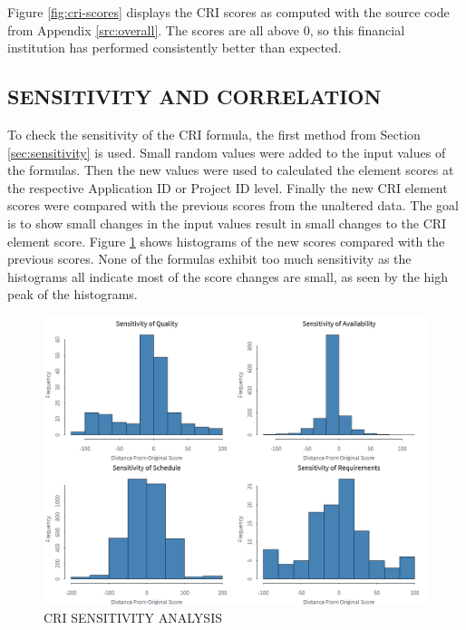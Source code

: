 \documentclass[SDSUThesis.tex]{subfiles}
\begin{document}
        Figure \ref{fig:cri-scores}
        displays the CRI scores as computed with the source code
        from Appendix \ref{src:overall}.  The scores are all above 0, so this
        financial institution has performed consistently better
        than expected.  
        
    \subsection{SENSITIVITY AND CORRELATION}
        
        To check the sensitivity of the CRI formula, the first method
        from Section \ref{sec:sensitivity} is used.  Small random
        values were added to the input values of the formulas. 
        Then the new values were used to calculated the element scores 
        at the respective Application ID or Project ID level.  Finally
        the new CRI element scores were compared with the previous
        scores from the unaltered data.  The goal is to show small
        changes in the input values result in small changes to the 
        CRI element score.  Figure \ref{fig:sensitivity} shows
        histograms of the new scores compared with the previous scores.
        None of the formulas exhibit too much sensitivity as the 
        histograms all indicate most of the score changes are small,
        as seen by the high peak of the histograms.  
        
        \begin{figure}[htb]
            \centering
            \includegraphics[scale=.3]{images/sensitivity.png}
            \caption{CRI SENSITIVITY ANALYSIS}
            \label{fig:sensitivity}
        \end{figure}
         
\end{document}
